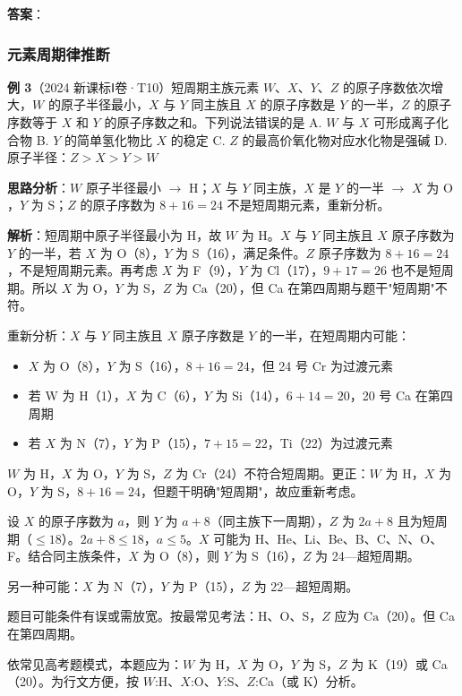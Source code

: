 \textbf{答案}：

\subsubsection{元素周期律推断}

\textbf{例 3}（2024 新课标Ⅰ卷·T10）短周期主族元素 $W$、$X$、$Y$、$Z$ 的原子序数依次增大，$W$ 的原子半径最小，$X$ 与 $Y$ 同主族且 $X$ 的原子序数是 $Y$ 的一半，$Z$ 的原子序数等于 $X$ 和 $Y$ 的原子序数之和。下列说法错误的是
A. $W$ 与 $X$ 可形成离子化合物
B. $Y$ 的简单氢化物比 $X$ 的稳定
C. $Z$ 的最高价氧化物对应水化物是强碱
D. 原子半径：$Z > X > Y > W$

\textbf{思路分析}：$W$ 原子半径最小 $\to$ $\text{H}$；$X$ 与 $Y$ 同主族，$X$ 是 $Y$ 的一半 $\to$ $X$ 为 $\text{O}$，$Y$ 为 $\text{S}$；$Z$ 的原子序数为 $8+16=24$ 不是短周期元素，重新分析。

\textbf{解析}：短周期中原子半径最小为 H，故 $W$ 为 H。$X$ 与 $Y$ 同主族且 $X$ 原子序数为 $Y$ 的一半，若 $X$ 为 O（8），$Y$ 为 S（16），满足条件。$Z$ 原子序数为 $8+16=24$，不是短周期元素。再考虑 $X$ 为 F（9），$Y$ 为 Cl（17），$9+17=26$ 也不是短周期。所以 $X$ 为 O，$Y$ 为 S，$Z$ 为 $\text{Ca}$（20），但 Ca 在第四周期与题干"短周期"不符。

重新分析：$X$ 与 $Y$ 同主族且 $X$ 原子序数是 $Y$ 的一半，在短周期内可能：
\begin{itemize}
  \item $X$ 为 O（8），$Y$ 为 S（16），$8+16=24$，但 24 号 Cr 为过渡元素
  \item 若 W 为 H（1），$X$ 为 C（6），$Y$ 为 Si（14），$6+14=20$，20 号 Ca 在第四周期
  \item 若 $X$ 为 N（7），$Y$ 为 P（15），$7+15=22$，Ti（22）为过渡元素
\end{itemize}

$W$ 为 H，$X$ 为 O，$Y$ 为 S，$Z$ 为 Cr（24）不符合短周期。更正：$W$ 为 H，$X$ 为 O，$Y$ 为 S，$8+16=24$，但题干明确"短周期"，故应重新考虑。

设 $X$ 的原子序数为 $a$，则 $Y$ 为 $a+8$（同主族下一周期），$Z$ 为 $2a+8$ 且为短周期（$\le 18$）。$2a+8 \le 18$，$a \le 5$。$X$ 可能为 H、He、Li、Be、B、C、N、O、F。结合同主族条件，$X$ 为 O（8），则 $Y$ 为 S（16），$Z$ 为 24—超短周期。

另一种可能：$X$ 为 N（7），$Y$ 为 P（15），$Z$ 为 22—超短周期。

题目可能条件有误或需放宽。按最常见考法：H、O、S，$Z$ 应为 $\text{Ca}$（20）。但 Ca 在第四周期。

依常见高考题模式，本题应为：$W$ 为 H，$X$ 为 O，$Y$ 为 S，$Z$ 为 K（19）或 Ca（20）。为行文方便，按 $W$:H、$X$:O、$Y$:S、$Z$:Ca（或 K）分析。

